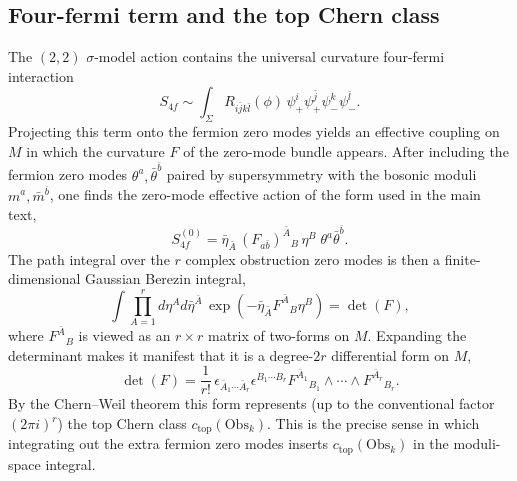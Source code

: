 \documentclass[12pt]{article}
\begin{document}
\subsection{Four-fermi term and the top Chern class}
The $(2,2)$ $\sigma$-model action contains the universal curvature four-fermi
interaction
\begin{equation*}
  S_{4f}\sim \int_\Sigma R_{i\bar jk\bar l}(\phi)\,
  \psi_{+}^{i}\psi_{+}^{\bar j}\psi_{-}^{k}\psi_{-}^{\bar l}.
\end{equation*}
Projecting this term onto the fermion zero modes yields an effective coupling
on $M$ in which the curvature $F$ of the zero-mode bundle appears. After
including the fermion zero modes $\theta^a,\bar\theta^{\bar b}$ paired by
supersymmetry with the bosonic moduli $m^a,\bar m^{\bar b}$, one finds the
zero-mode effective action of the form used in the main text,
\begin{equation*}
  S_{4f}^{(0)}=\bar\eta_{\bar A}\,(F_{a\bar b})^{\bar A}{}_B\,\eta^B\;\theta^a\bar\theta^{\bar b}.
\end{equation*}
The path integral over the $r$ complex obstruction zero modes is then a
finite-dimensional Gaussian Berezin integral,
\begin{equation*}
  \int \prod_{A=1}^r d\eta^A d\bar\eta^{\bar A}\,
  \exp\!\left(-\bar\eta_{\bar A}F^{\bar A}{}_B\eta^B\right)
  = \det(F),
\end{equation*}
where $F^{\bar A}{}_B$ is viewed as an $r\times r$ matrix of two-forms on $M$.
Expanding the determinant makes it manifest that it is a degree-$2r$ differential
form on $M$,
\begin{equation*}
  \det(F)=\frac{1}{r!}\,\epsilon_{\bar A_1\cdots \bar A_r}\epsilon^{B_1\cdots B_r}
  F^{\bar A_1}{}_{B_1}\wedge\cdots\wedge F^{\bar A_r}{}_{B_r}.
\end{equation*}
By the Chern--Weil theorem this form represents (up to the conventional factor
$(2\pi i)^r$) the top Chern class $c_{\mathrm{top}}(\mathrm{Obs}_k)$. This is
the precise sense in which integrating out the extra fermion zero modes inserts
$c_{\mathrm{top}}(\mathrm{Obs}_k)$ in the moduli-space integral.
\end{document}
